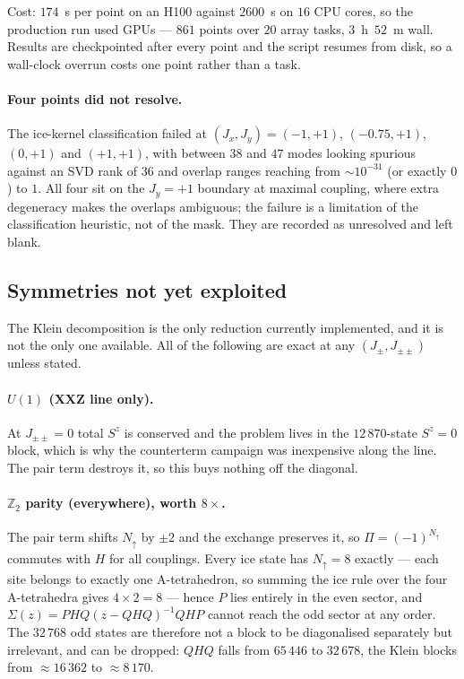 \documentclass[11pt]{article}
\newcommand{\Jpm}{J_{\pm}}
\newcommand{\Jpmpm}{J_{\pm\pm}}
\begin{document}
Cost: $174$~s per point on an H100 against $2600$~s on $16$ CPU cores, so
the production run used GPUs --- $861$ points over $20$ array tasks,
$3$~h~$52$~m wall.  Results are checkpointed after every point and the
script resumes from disk, so a wall-clock overrun costs one point rather
than a task.

\paragraph{Four points did not resolve.}  The ice-kernel classification
failed at $(J_x,J_y)=(-1,+1)$, $(-0.75,+1)$, $(0,+1)$ and $(+1,+1)$, with
between $38$ and $47$ modes looking spurious against an SVD rank of $36$
and overlap ranges reaching from $\sim10^{-31}$ (or exactly $0$) to $1$.
All four sit on the $J_y=+1$ boundary at maximal coupling, where extra
degeneracy makes the overlaps ambiguous; the failure is a limitation of the
classification heuristic, not of the mask.  They are recorded as
unresolved and left blank.

\subsection{Symmetries not yet exploited}
\label{sec:unused}

The Klein decomposition is the only reduction currently implemented, and it
is not the only one available.  All of the following are exact at any
$(\Jpm,\Jpmpm)$ unless stated.

\paragraph{$U(1)$ (XXZ line only).}  At $\Jpmpm=0$ total $S^z$ is
conserved and the problem lives in the $12\,870$-state $S^z=0$ block,
which is why the counterterm campaign was inexpensive along the line.  The
pair term destroys it, so this buys nothing off the diagonal.

\paragraph{$\mathbb{Z}_2$ parity (everywhere), worth $8\times$.}  The pair
term shifts $N_\uparrow$ by $\pm2$ and the exchange preserves it, so
$\Pi=(-1)^{N_\uparrow}$ commutes with $H$ for all couplings.  Every ice
state has $N_\uparrow=8$ exactly --- each site belongs to exactly one
A-tetrahedron, so summing the ice rule over the four A-tetrahedra gives
$4\times2=8$ --- hence $P$ lies entirely in the even sector, and
$\Sigma(z)=PHQ(z-QHQ)^{-1}QHP$ cannot reach the odd sector at any order.
The $32\,768$ odd states are therefore not a block to be diagonalised
separately but irrelevant, and can be dropped: $QHQ$ falls from $65\,446$
to $32\,678$, the Klein blocks from $\approx16\,362$ to $\approx8\,170$.
\end{document}
